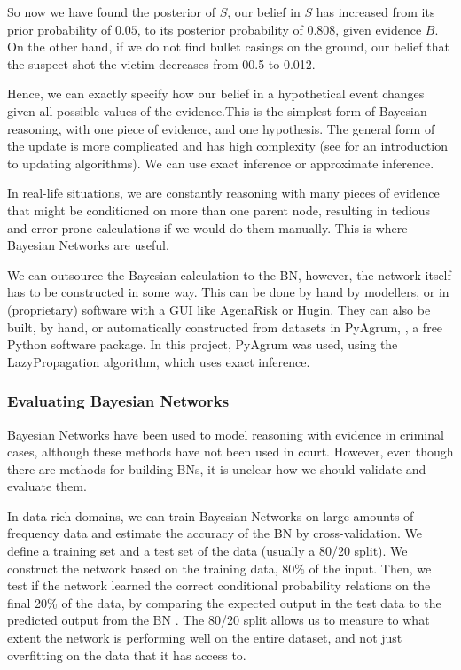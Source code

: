 \documentclass[12pt]{article}
\begin{document}
So now we have found the posterior of $S$, our belief in $S$ has increased from its prior probability of $0.05$, to its posterior probability of $0.808$, given evidence $B$. On the other hand, if we do not find bullet casings on the ground, our belief that the suspect shot the victim decreases from 00.5 to 0.012. 


Hence, we can exactly specify how our belief in a hypothetical event changes given all possible values of the evidence.This is the simplest form of Bayesian reasoning, with one piece of evidence, and one hypothesis. The general form of the update is more complicated and has high complexity (see \citep{russellNorvig2010} for an introduction to updating algorithms). We can use exact inference or approximate inference.


In real-life situations, we are constantly reasoning with many pieces of evidence that might be conditioned on more than one parent node, resulting in tedious and error-prone calculations if we would do them manually. This is where Bayesian Networks are useful. 



We can outsource the Bayesian calculation to the BN, however, the network itself has to be constructed in some way. This can be done by hand by modellers, or in (proprietary) software with a GUI like AgenaRisk or Hugin. They can also be built, by hand, or automatically constructed from datasets in PyAgrum, \citep{pyagrum2020}, a free Python software package. In this project, PyAgrum was used, using the LazyPropagation algorithm, which uses exact inference.



\subsubsection{Evaluating Bayesian Networks}

Bayesian Networks have been used to model reasoning with evidence in criminal cases, although these methods have not been used in court. However, even though there are methods for building BNs, it is unclear how we should validate and evaluate them. 

In data-rich domains, we can train Bayesian Networks on large amounts of frequency data and estimate the accuracy of the BN by cross-validation. We define a training set and a test set of the data (usually a 80/20 split). We construct the network based on the training data, 80\% of the input. Then, we test if the network learned the correct conditional probability relations on the final 20\% of the data, by comparing the expected output in the test data to the predicted output from the BN \citep{chen2012}. The 80/20 split allows us to measure to what extent the network is performing well on the entire dataset, and not just overfitting on the data that it has access to.
\end{document}
